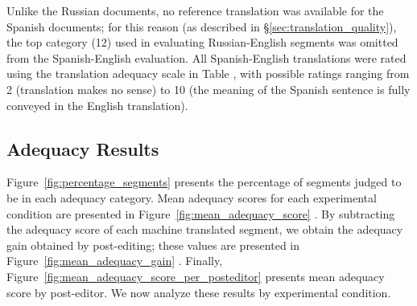 Unlike the Russian documents, no reference translation was available for the Spanish documents; for this reason (as described in \S\ref{sec:translation_quality}), the top category (12) used in evaluating Russian-English segments was omitted from the Spanish-English evaluation.
%
All Spanish-English translations were rated using the translation adequacy scale in Table , with possible ratings ranging from  2 (translation makes no sense) to 10 (the meaning of the Spanish sentence is fully conveyed in the English translation).
%
%
% 



\subsection{Adequacy Results}

Figure~\ref{fig:percentage_segments}  presents the percentage of segments judged to be in each adequacy category.
%
Mean adequacy scores for each experimental condition are presented in Figure~\ref{fig:mean_adequacy_score} .
%
By subtracting the adequacy score of each machine translated segment, we obtain the adequacy gain obtained by post-editing;
%
these values are presented in Figure~\ref{fig:mean_adequacy_gain} .
%
%
Finally, Figure~\ref{fig:mean_adequacy_score_per_posteditor}  presents mean adequacy score by post-editor.
%
We now analyze these results by experimental condition.

